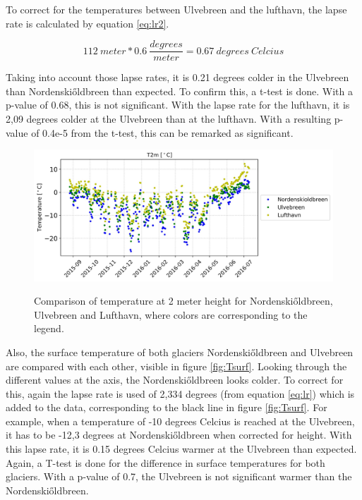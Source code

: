 \documentclass[11pt]{report}
\begin{document}
To correct for the temperatures between Ulvebreen and the lufthavn, the lapse rate is calculated by equation \ref{eq:lr2}.

\begin{equation}\label{eq:lr2}
112 \ meter * 0.6 \ \frac{degrees}{meter} = 0.67 \ degrees \ Celcius
\end{equation}

Taking into account those lapse rates, it is 0.21 degrees colder in the Ulvebreen than Nordenski\H{o}ldbreen than expected. To confirm this, a t-test is done. With a p-value of 0.68, this is not significant. With the lapse rate for the lufthavn, it is 2,09 degrees colder at the Ulvebreen than at the lufthavn. With a resulting p-value of 0.4e-5 from the t-test, this can be remarked as significant. \\


\begin{figure}[h]
\centering{}
    \includegraphics[scale=1, width=1\textwidth]{T2m.jpg}
    \label{fig:T2m}
    \caption{Comparison of temperature at 2 meter height for Nordenski\H{o}ldbreen, Ulvebreen and Lufthavn, where colors are corresponding to the legend.}
\end{figure}

Also, the surface temperature of both glaciers Nordenski\H{o}ldbreen and Ulvebreen are compared with each other, visible in figure 
\ref{fig:Tsurf}. Looking through the different values at the axis, the Nordenski\H{o}ldbreen looks colder. To correct for this, again the lapse rate is used of 2,334 degrees (from equation \ref{eq:lr}) which is added to the data, corresponding to the black line in figure \ref{fig:Tsurf}. For example, when a temperature of -10 degrees Celcius is reached at the Ulvebreen, it has to be -12,3 degrees at Nordenski\H{o}ldbreen when corrected for height. With this lapse rate, it is 0.15 degrees Celcius warmer at the Ulvebreen than expected. Again, a T-test is done for the difference in surface temperatures for both glaciers. With a p-value of 0.7, the Ulvebreen is not significant warmer than the Nordenski\H{o}ldbreen.
\end{document}

